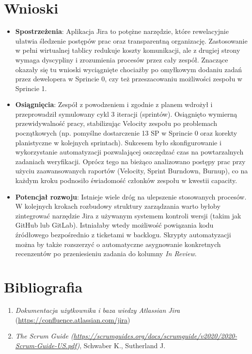 \documentclass[12pt,a4paper]{article}
\begin{document}
\section{Wnioski}
	\begin{itemize}
		\item \textbf{Spostrzeżenia}: Aplikacja Jira to potężne narzędzie, które rewelacyjnie ułatwia śledzenie postępów prac oraz transparentną organizację. Zastosowanie w pełni wirtualnej tablicy redukuje koszty komunikacji, ale z drugiej strony wymaga dyscypliny i zrozumienia procesów przez cały zespół. Znaczące okazały się tu wnioski wyciągnięte chociażby po omyłkowym dodaniu zadań przez dewelopera w Sprincie 0, czy też przeszacowaniu możliwości zespołu w Sprincie 1.
		\item \textbf{Osiągnięcia}: Zespół z powodzeniem i zgodnie z planem wdrożył i przeprowadził symulowany cykl 3 iteracji (sprintów). Osiągnięto wymierną przewidywalność pracy, stabilizując Velocity zespołu po problemach początkowych (np. pomyślne dostarczenie 13 SP w Sprincie 0 oraz korekty planistyczne w kolejnych sprintach). Sukcesem było skonfigurowanie i wykorzystanie automatyzacji pozwalającej oszczędzać czas na powtarzalnych zadaniach weryfikacji. Oprócz tego na bieżąco analizowano postępy prac przy użyciu zaawansowanych raportów (Velocity, Sprint Burndown, Burnup), co na każdym kroku podnosiło świadomość członków zespołu w kwestii capacity.
		\item \textbf{Potencjał rozwoju}: Istnieje wiele dróg na ulepszenie stosowanych procesów. W kolejnych krokach rozbudowy struktury zarządzania warto byłoby zintegrować narzędzie Jira z używanym systemem kontroli wersji (takim jak GitHub lub GitLab). Istniałaby wtedy możliwość powiązania kodu źródłowego bezpośrednio z ticketami w backlogu. Skrypty automatyzacji można by także rozszerzyć o automatyczne asygnowanie konkretnych recenzentów po przeniesieniu zadania do kolumny \textit{In Review}.
	\end{itemize}





\newpage
\section{Bibliografia}
\begin{enumerate}
	\item \textit{Dokumentacja użytkownika i baza wiedzy Atlassian Jira} (\url{https://confluence.atlassian.com/jira})
	\item \textit{The Scrum Guide (\url{https://scrumguides.org/docs/scrumguide/v2020/2020-Scrum-Guide-US.pdf})}, Schwaber K., Sutherland J.
\end{enumerate}
\end{document}
